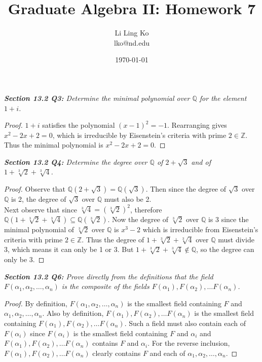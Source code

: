 \documentclass{article}
\begin{document}
\title{Graduate Algebra II: Homework 7}
\author{Li Ling Ko\\ lko@nd.edu}
\date{\today}
\maketitle

\it \textbf{Section 13.2 Q3:} Determine the minimal polynomial over
  $\mathbb{Q}$ for the element $1+i$.

  \begin{proof}
    $1+i$ satisfies the polynomial $(x-1)^2=-1$. Rearranging gives
    $x^2-2x+2=0$, which is irreducible by Eisenstein's criteria with prime
    $2\in\mathbb{Z}$. Thus the minimal polynomial is $x^2-2x+2=0$.
  \end{proof}

\it \textbf{Section 13.2 Q4:} Determine the degree over $\mathbb{Q}$ of
  $2+\sqrt{3}$ and of $1+\sqrt[3]{2}+\sqrt[3]{4}$.

  \begin{proof}
    Observe that $\mathbb{Q}(2+\sqrt{3}) =\mathbb{Q}(\sqrt{3})$. Then since
    the degree of $\sqrt{3}$ over $\mathbb{Q}$ is 2, the degree of
    $\sqrt{3}$ over $\mathbb{Q}$ must also be 2. \\

    Next observe that since $\sqrt[3]{4}=(\sqrt[3]{2})^2$, therefore
    $\mathbb{Q}(1+\sqrt[3]{2}+\sqrt[3]{4})\subseteq
    \mathbb{Q}(\sqrt[3]{2})$. Now the degree of $\sqrt[3]{2}$ over
    $\mathbb{Q}$ is 3 since the minimal polynomial of $\sqrt[3]{2}$ over
    $\mathbb{Q}$ is $x^3-2$ which is irreducible from Eisenstein's criteria
    with prime $2\in\mathbb{Z}$. Thus the degree of
    $1+\sqrt[3]{2}+\sqrt[3]{4}$ over $\mathbb{Q}$ must divide 3, which
    means it can only be 1 or 3. But
    $1+\sqrt[3]{2}+\sqrt[3]{4}\not\in\mathbb{Q}$, so the degree can only be
    3.
  \end{proof}

\it \textbf{Section 13.2 Q6:} Prove directly from the definitions that the
  field $F(\alpha_1,\alpha_2,\ldots,\alpha_n)$ is the composite of the
  fields $F(\alpha_1),F(\alpha_2),\ldots F(\alpha_n)$.

  \begin{proof}
    By definition, $F(\alpha_1,\alpha_2,\ldots,\alpha_n)$ is the smallest
    field containing $F$ and $\alpha_1,\alpha_2,\ldots,\alpha_n$. Also by
    definition, $F(\alpha_1),F(\alpha_2),\ldots F(\alpha_n)$ is the
    smallest field containing $F(\alpha_1),F(\alpha_2),\ldots F(\alpha_n)$.
    Such a field must also contain each of $F(\alpha_i)$ since
    $F(\alpha_i)$ is the smallest field containing $F$ and $\alpha_i$ and
    $F(\alpha_1),F(\alpha_2),\ldots F(\alpha_n)$ contains $F$ and
    $\alpha_i$. For the reverse inclusion, $F(\alpha_1),F(\alpha_2),\ldots
    F(\alpha_n)$ clearly contains $F$ and each of
    $\alpha_1,\alpha_2,\ldots,\alpha_n$.
  \end{proof}
\end{document}
